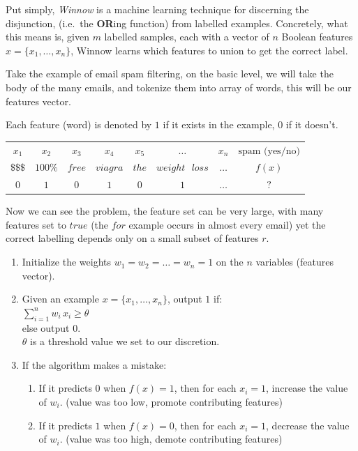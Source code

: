 


Put simply, \textit{Winnow} is a machine learning technique for discerning the
disjunction, (i.e.\ the \textbf{OR}ing function) from labelled examples.
Concretely, what this means is, given \(m\) labelled samples, each with a
vector of \(n\) Boolean features \(x = \{x_1, \ldots, x_n\}\), Winnow learns
which features to union to get the correct label.

Take the example of email spam filtering, on the basic level, we will take the
body of the many emails, and tokenize them into array of words, this will be
our features vector.

Each feature (word) is denoted by \(1\) if it exists in the example, \(0\) if
it doesn't.

\begin{tabularx}{\textwidth}{c c c c c c c c}
    \(x_1\)    & \(x_2\)   & \(x_3\)  & \(x_4\)    & \(x_5\) & \(\ldots\)               & \(x_n\)    & \(\text{spam (yes/no)}\)\\
    \(\$\$\$\) & \(100\%\) & \(free\) & \(viagra\) & \(the\) & \(weight\text{\ } loss\) & \(\ldots\) & \(f(x)\)\\
    \(0\)      & \(1\)     & \(0\)    & \(1\)      & \(0\)   & \(1\)                    & \(\ldots\) & \(?\)
\end{tabularx}

Now we can see the problem, the feature set can be very large, with many
features set to \(true\) (the \(for\) example occurs in almost every email) yet
the correct labelling depends only on a small subset of features \(r\).


\begin{enumerate}
    \item Initialize the weights \(w_1 = w_2 = \ldots = w_n = 1\) on the \(n\)
    variables (features vector).
    \item Given an example \(x = \{x_1, \ldots, x_n\}\), output \(1\) if:\\
    \(\displaystyle\sum_{i=1}^{n} w_i\, x_i \geq \theta\)\\
    else output \(0\).\\
    \(\theta\) is a threshold value we set to our discretion.
    \item If the algorithm makes a mistake:
    \begin{enumerate}
        \item If it predicts \(0\) when \(f(x) = 1\), then for each \(x_i = 1\), increase the value of \(w_i\). (value was too low, promote contributing features)
        \item If it predicts \(1\) when \(f(x) = 0\), then for each \(x_i = 1\), decrease the value of \(w_i\). (value was too high, demote contributing features)
    \end{enumerate}
\end{enumerate}

